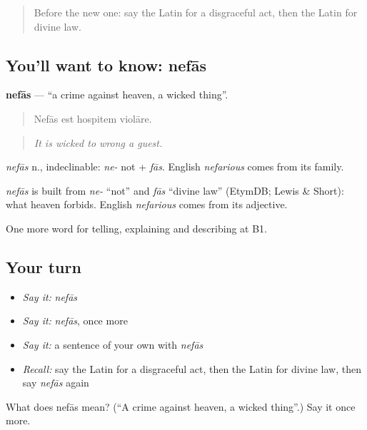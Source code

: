 \begin{quote}
Before the new one: say the Latin for a disgraceful act, then the Latin for divine law.
\end{quote}

\subsection*{You'll want to know: nefās}
\textbf{nefās} — \textquotedblleft{}a crime against heaven, a wicked thing\textquotedblright{}.

\begin{quote}
Nefās est hospitem violāre.
\end{quote}

\begin{quote}
\emph{It is wicked to wrong a guest.}
\end{quote}

\emph{nefās} n., indeclinable: \emph{ne-} not + \emph{fās}. English \emph{nefarious} comes from its family.

\begin{cousinweb}
\emph{nefās} is built from \emph{ne-} \textquotedblleft{}not\textquotedblright{} and \emph{fās} \textquotedblleft{}divine law\textquotedblright{} (EtymDB; Lewis \& Short): what heaven forbids. English \emph{nefarious} comes from its adjective.
\end{cousinweb}

\begin{grammarlens}[title={What you've built}]
One more word for telling, explaining and describing at B1.
\end{grammarlens}

\subsection*{Your turn}
\begin{itemize}
\raggedright
  \item \emph{Say it:} \emph{nefās}
  \item \emph{Say it:} \emph{nefās}, once more
  \item \emph{Say it:} a sentence of your own with \emph{nefās}
  \item \emph{Recall:} say the Latin for a disgraceful act, then the Latin for divine law, then say \emph{nefās} again
\end{itemize}

\begin{tcolorbox}[breakable,colback=teal!4,colframe=teal!35!black,title={Before you move on}]
What does nefās mean? (\textquotedblleft{}A crime against heaven, a wicked thing\textquotedblright{}.) Say it once more.
\end{tcolorbox}
